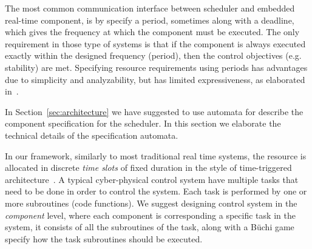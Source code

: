 \documentclass[ twoside, 12pt ]{article}
\newcommand{\buchi}{B\"uchi }
\begin{document}
The most common communication interface between scheduler and embedded real-time component, is by specify a period, sometimes along with a deadline, which gives the frequency at which the component must be executed.
The only requirement in those type of systems is that if the component is always executed exactly within the designed frequency (period), then the control objectives (e.g. stability) are met.
Specifying resource requirements using periods has advantages due to simplicity and analyzability, but has limited expressiveness, as elaborated in~\cite{RTComposer}. 

In Section~\ref{sec:architecture} we have suggested to use automata for describe the component specification for the scheduler. In this section we elaborate the technical details of the specification automata.

In our framework, similarly to most traditional real time systems, the resource is allocated in discrete \textit{time slots} of fixed duration in the style of time-triggered architecture~\cite{RTComposer}.
A typical cyber-physical control system have multiple tasks that need to be done in order to control the system.
Each task is performed by one or more subroutines (code functions).
We suggest designing control system in the \textit{component} level, where each component is corresponding a specific task in the system, it consists of all the subroutines of the task, along with a \buchi game specify how the task subroutines should be executed.
\end{document}
